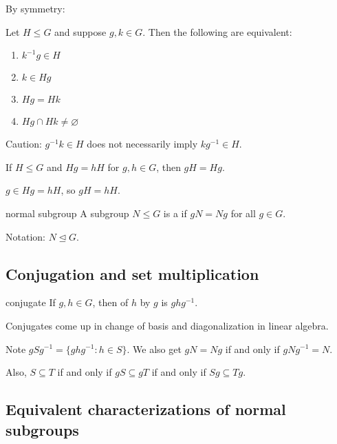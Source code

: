 \documentclass[12pt,letterpaper]{report}
\begin{document}
By symmetry:

\begin{prop}{}{}
  Let $H \leq G$ and suppose $g, k \in G$.
  Then the following are equivalent:
  \begin{enumerate}
    \item $k^{-1}g \in H$
    \item $k \in Hg$
    \item $Hg = Hk$
    \item $Hg \cap Hk \neq \varnothing$
  \end{enumerate}
\end{prop}

Caution: $g^{-1}k \in H$ does not necessarily imply $kg^{-1} \in H$.

\begin{lem}{}{}
  If $H \leq G$ and $Hg = hH$ for $g, h \in G$, then $gH = Hg$.
\end{lem}

\begin{thmproof}
  $g \in Hg = hH$, so $gH = hH$.
\end{thmproof}

\begin{defn}{normal subgroup}{}
  A subgroup $N \leq G$ is a  if $gN = Ng$ for all $g \in G$.

  Notation: $N \trianglelefteq G$.
\end{defn}

\pagebreak
\subsection{Conjugation and set multiplication}

\begin{defn}{conjugate}{}
  If $g, h \in G$, then  of $h$ by $g$ is $ghg^{-1}$.
\end{defn}

Conjugates come up in change of basis and diagonalization in linear algebra.

Note $gSg^{-1} = \{ghg^{-1} : h \in S\}$.
We also get $gN = Ng$ if and only if $gNg^{-1} = N$.

Also, $S \subseteq T$ if and only if $gS \subseteq gT$ if and only if $Sg \subseteq Tg$.

\pagebreak
\subsection{Equivalent characterizations of normal subgroups}
\end{document}
